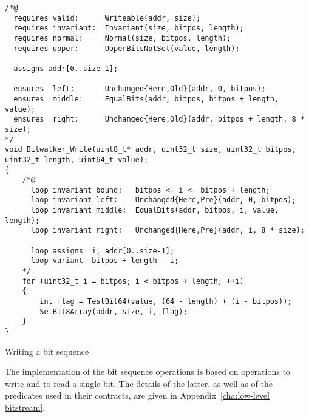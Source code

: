 \begin{listing}[hbt]
\begin{minipage}{0.99\textwidth}
\begin{lstlisting}[style=acsl-block]
/*@
  requires valid:      Writeable(addr, size);
  requires invariant:  Invariant(size, bitpos, length);
  requires normal:     Normal(size, bitpos, length);
  requires upper:      UpperBitsNotSet(value, length);

  assigns addr[0..size-1];

  ensures  left:       Unchanged{Here,Old}(addr, 0, bitpos);
  ensures  middle:     EqualBits(addr, bitpos, bitpos + length, value);
  ensures  right:      Unchanged{Here,Old}(addr, bitpos + length, 8 * size);
*/
void Bitwalker_Write(uint8_t* addr, uint32_t size, uint32_t bitpos, uint32_t length, uint64_t value);
{
    /*@
      loop invariant bound:   bitpos <= i <= bitpos + length;
      loop invariant left:    Unchanged{Here,Pre}(addr, 0, bitpos);
      loop invariant middle:  EqualBits(addr, bitpos, i, value, length);
      loop invariant right:   Unchanged{Here,Pre}(addr, i, 8 * size);

      loop assigns  i, addr[0..size-1];
      loop variant  bitpos + length - i;
    */
    for (uint32_t i = bitpos; i < bitpos + length; ++i)
    {
        int flag = TestBit64(value, (64 - length) + (i - bitpos));
        SetBit8Array(addr, size, i, flag);
    }   
}

\end{lstlisting}
\end{minipage}
\caption{\label{Bitwalker_Write spec}Writing a bit sequence}
\end{listing}





The implementation of the bit sequence operations is based
on operations to write and to read a single bit.
%
The details of the latter, as well as of the predicates used in their
contracts, are given in Appendix~\ref{cha:low-level bitstream}.















